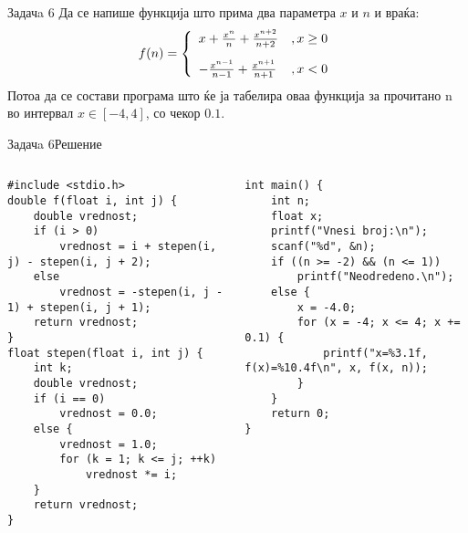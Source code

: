 \begin{frame}{Задачa 6}
Да се напише функција што прима два параметра $x$ и $n$ и враќа:
\[
   f(n) = \left\{ 
  \begin{array}{l l}
    x + \frac{x^n}{n} + \frac{x^{n+2}}{n + 2} &,x\geq0\\[10px]
    - \frac{x^{n - 1}}{n - 1} + \frac{x^{n+1}}{n + 1} &,x<0
  \end{array} \right.
\]
Потоа да се состави програма што ќе ја табелира оваа функција за прочитано n во
интервал $x\in[-4, 4]$, со чекор $0.1$.
\end{frame}

\begin{frame}[fragile]{Задачa 6}{Решение}
\begin{columns}
    \begin{lstlisting}
#include <stdio.h>
double f(float i, int j) {
    double vrednost;
    if (i > 0)
        vrednost = i + stepen(i, j) - stepen(i, j + 2);
    else
        vrednost = -stepen(i, j - 1) + stepen(i, j + 1);
    return vrednost;
}
float stepen(float i, int j) {
    int k;
    double vrednost;
    if (i == 0)
        vrednost = 0.0;
    else {
        vrednost = 1.0;
        for (k = 1; k <= j; ++k)
            vrednost *= i;
    }
    return vrednost;
}
\end{lstlisting}
\begin{lstlisting}
int main() {
    int n;
    float x;
    printf("Vnesi broj:\n");
    scanf("%d", &n);
    if ((n >= -2) && (n <= 1))
        printf("Neodredeno.\n");
    else {
        x = -4.0;
        for (x = -4; x <= 4; x += 0.1) {
            printf("x=%3.1f, f(x)=%10.4f\n", x, f(x, n));
        }
    }
    return 0;
}
\end{lstlisting}
\end{columns}
\end{frame}

